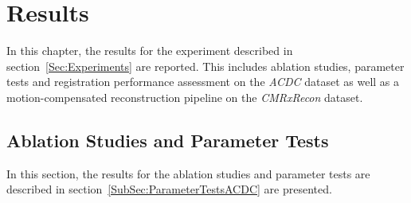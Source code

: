 
\chapter{Results} \label{Ch:Results}
In this chapter, the results for the experiment described in section~\ref{Sec:Experiments} are reported. This includes ablation studies, parameter tests and registration performance assessment on the \emph{ACDC} dataset as well as a motion-compensated reconstruction pipeline on the \emph{CMRxRecon} dataset.
 
\section{Ablation Studies and Parameter Tests} \label{Sec:ResultsParameterTestsACDC}
In this section, the results for the ablation studies and parameter tests are described in section~\ref{SubSec:ParameterTestsACDC} are presented.

